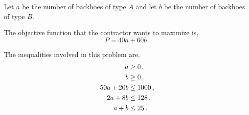 %
%

\begin{subquestions}


\subquestion

Let $a$ be the number of backhoes of type $A$ and let $b$ be the number of backhoes of type $B$.

\begin{subsubquestions}
	

\subsubquestion

The objective function that the contractor wants to maximize is,
\begin{equation}
	P = 40a + 60b \,.
\end{equation}


\subsubquestion

The inequalities involved in this problem are,
\begin{align}
	a & \geq 0 \,, \nonumber \\
	b & \geq 0 \,, \nonumber \\
	50a + 20b & \leq 1000 \,, \nonumber \\
	2a + 8b & \leq 128\,, \nonumber \\
	a + b & \leq 25\,.
\end{align}


\end{subsubquestions}
\end{subquestions}
